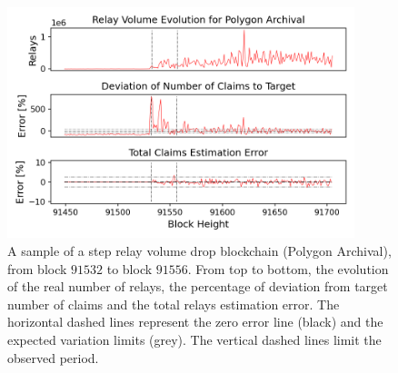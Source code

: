\documentclass[runningheads]{llncs}
\begin{document}
\begin{figure}
    \includegraphics[width=0.9\textwidth]{v0_polygon_arch.png}
    \caption{A sample of a step relay volume drop blockchain (Polygon Archival), from block $91532$  to block $91556$. From top to bottom, the evolution of the real number of relays, the percentage of deviation from target number of claims and the total relays estimation error. The horizontal dashed lines represent the zero error line (black) and the expected variation limits (grey). The vertical dashed lines limit the observed period.} \label{fig:v0-poly_arch}
\end{figure}
\end{document}
